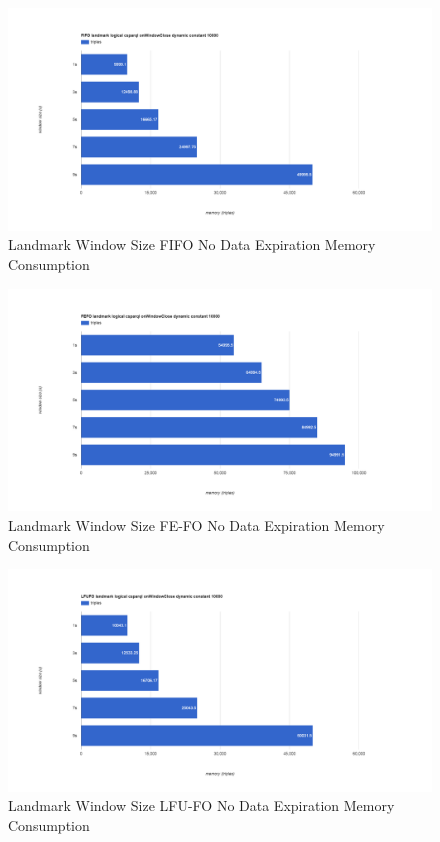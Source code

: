 \begin{figure}[!htbp]
    \centering
    \includegraphics[width=\textwidth]{img/app3-land-ws-fifo-no-m.png}
    \caption{Landmark Window Size FIFO No Data Expiration Memory Consumption}
\end{figure}
\begin{figure}[!htbp]
    \centering
    \includegraphics[width=\textwidth]{img/app3-land-ws-fefo-no-m.png}
    \caption{Landmark Window Size FE-FO No Data Expiration Memory Consumption}
\end{figure}
\begin{figure}[!htbp]
    \centering
    \includegraphics[width=\textwidth]{img/app3-land-ws-lfufo-no-m.png}
    \caption{Landmark Window Size LFU-FO No Data Expiration Memory Consumption}
\end{figure}
